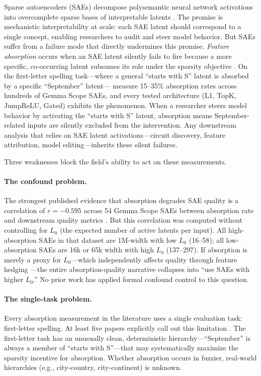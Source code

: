 \documentclass{article}
\begin{document}
Sparse autoencoders (SAEs) decompose polysemantic neural network activations into overcomplete sparse bases of interpretable latents \citep{bricken2023monosemanticity,templeton2024scaling}.
The promise is mechanistic interpretability at scale: each SAE latent should correspond to a single concept, enabling researchers to audit and steer model behavior.
But SAEs suffer from a failure mode that directly undermines this promise.
\emph{Feature absorption} occurs when an SAE latent silently fails to fire because a more specific, co-occurring latent subsumes its role under the sparsity objective \citep{chanin2024absorption}.
On the first-letter spelling task---where a general ``starts with S'' latent is absorbed by a specific ``September'' latent---\citet{chanin2024absorption} measure 15--35\% absorption rates across hundreds of Gemma Scope SAEs, and every tested architecture (L1, TopK, JumpReLU, Gated) exhibits the phenomenon.
When a researcher steers model behavior by activating the ``starts with S'' latent, absorption means September-related inputs are silently excluded from the intervention.
Any downstream analysis that relies on SAE latent activations---circuit discovery, feature attribution, model editing---inherits these silent failures.

Three weaknesses block the field's ability to act on these measurements.

\paragraph{The confound problem.}
The strongest published evidence that absorption degrades SAE quality is a correlation of $r = -0.595$ across 54 Gemma Scope SAEs between absorption rate and downstream quality metrics \citep{chanin2024absorption,karvonen2025saebench}.
But this correlation was computed without controlling for $L_0$ (the expected number of active latents per input).
All high-absorption SAEs in that dataset are 1M-width with low $L_0$ (16--58); all low-absorption SAEs are 16k or 65k width with high $L_0$ (137--297).
If absorption is merely a proxy for $L_0$---which independently affects quality through feature hedging \citep{chanin2025hedging}---the entire absorption-quality narrative collapses into ``use SAEs with higher $L_0$.''
No prior work has applied formal confound control to this question.

\paragraph{The single-task problem.}
Every absorption measurement in the literature uses a single evaluation task: first-letter spelling.
At least five papers explicitly call out this limitation \citep{chanin2024absorption,karvonen2025saebench,korznikov2025ortsae,bussmann2025matryoshka,li2025atm}.
The first-letter task has an unusually clean, deterministic hierarchy---``September'' is always a member of ``starts with S''---that may systematically maximize the sparsity incentive for absorption.
Whether absorption occurs in fuzzier, real-world hierarchies (e.g., city-country, city-continent) is unknown.
\end{document}
